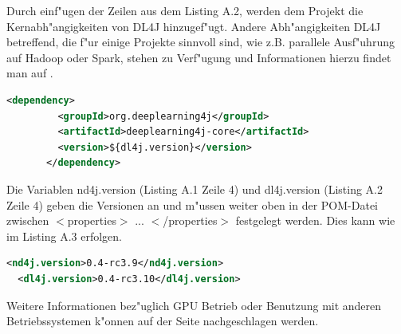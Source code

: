 {Durch einf"ugen der Zeilen aus dem Listing A.2, werden dem Projekt die Kernabh"angigkeiten von DL4J hinzugef"ugt. Andere Abh"angigkeiten DL4J betreffend, die f"ur einige Projekte sinnvoll sind, wie z.B. parallele Ausf"uhrung auf Hadoop oder Spark, stehen zu Verf"ugung und Informationen hierzu findet man auf \cite{ND4J}.
\begin{lstlisting}[language=XML,caption=DL4J Dependency]
	   <dependency>
	     <groupId>org.deeplearning4j</groupId>
	     <artifactId>deeplearning4j-core</artifactId>
	     <version>${dl4j.version}</version>
	   </dependency>
\end{lstlisting}

Die Variablen \glqq nd4j.version\grqq{} (Listing A.1 Zeile 4) und \glqq dl4j.version\grqq{} (Listing A.2 Zeile 4) geben die Versionen an und m"ussen weiter oben in der POM-Datei zwischen $<$properties$>$ ... $<$/properties$>$ festgelegt werden. Dies kann wie im Listing A.3 erfolgen.
\begin{lstlisting}[language=XML,caption=Versionsvariablen]
  <nd4j.version>0.4-rc3.9</nd4j.version>
  <dl4j.version>0.4-rc3.10</dl4j.version>
\end{lstlisting}

Weitere Informationen bez"uglich GPU Betrieb oder Benutzung mit anderen Betriebssystemen k"onnen auf der \cite{ND4J} Seite nachgeschlagen werden.
}